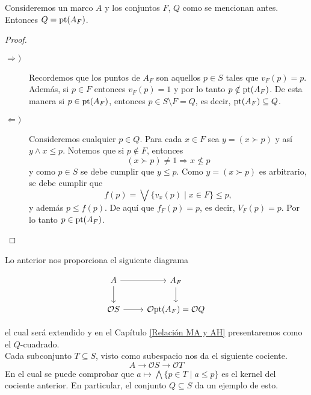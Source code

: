 \begin{lem}\label{Lema5.7.1}
    Consideremos un marco $A$ y los conjuntos $F$, $Q$ como se mencionan antes. Entonces $Q=\mathrm{pt}(A_F)$.
\end{lem}

\begin{proof}
\begin{description}
    \item[$\Rightarrow) $] Recordemos que los puntos de $A_F$ son aquellos $p\in S$ tales que $v_F(p)=p$. Además, si $p\in F$ entonces $v_F(p)=1$ y por lo tanto $p\notin \mathrm{pt}(A_F)$. De esta manera si $p\in \mathrm{pt}(A_F)$, entonces $p\in S\setminus F=Q$, es decir, $\mathrm{pt}(A_F)\subseteq Q$.
    
    \item[$\Leftarrow) $] Consideremos cualquier $p\in Q$. Para cada $x\in F$ sea $y=(x\succ p)$ y así $y\wedge x\leq p$. Notemos que si $p\notin F$, entonces
    \[
    (x\succ p)\neq 1\Rightarrow x\nleq p
    \]
    y como $p\in S$ se debe cumplir que $y\leq p$. Como $y=(x\succ p)$ es arbitrario, se debe cumplir que
    \[
    f(p)=\bigvee\{v_x(p)\mid x\in F\}\leq p,
    \]
    y además $p\leq f(p)$. De aquí que $f_F(p)=p$, es decir, $V_F(p)=p$. Por lo tanto $p \in \mathrm{pt}(A_F)$. 
    
\end{description}
\end{proof}

Lo anterior nos proporciona el siguiente diagrama


\begin{equation}
    \begin{tikzcd}
	A & {A_F} \\
	{\mathcal{O}S} & {\mathcal{O}\pt(A_F)=\mathcal{O}Q}
	\arrow[from=1-1, to=1-2]
	\arrow[from=1-1, to=2-1]
	\arrow[from=1-2, to=2-2]
	\arrow[from=2-1, to=2-2]
\end{tikzcd}
\end{equation}

el cual será extendido y en el Capítulo \ref{Relación MA y AH} presentaremos como el $Q$-cuadrado.\\

Cada subconjunto $T\subseteq S$, visto como subespacio nos da el siguiente cociente.
\[
A\to \mathcal{O}S\to \mathcal{O}T
\]
En el cual se puede comprobar que $a\mapsto \bigwedge \{p\in T\mid a\leq p\}$ es el kernel del cociente anterior. En particular, el conjunto $Q\subseteq S$ da un ejemplo de esto.\\

